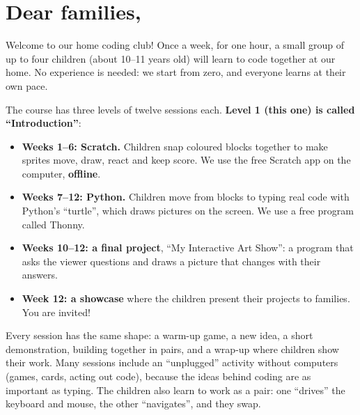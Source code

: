 \documentclass[level=1]{kidscode}
\begin{document}

\section{Dear families,}
Welcome to our home coding club! Once a week, for one hour, a small group of up to four children
(about 10--11 years old) will learn to code together at our home. No experience is needed: we start
from zero, and everyone learns at their own pace.

The course has three levels of twelve sessions each. \textbf{Level 1 (this one) is called
\enquote{Introduction}}:
\begin{itemize}[itemsep=2pt]
  \item \textbf{Weeks 1--6: Scratch.} Children snap coloured blocks together to make sprites move, draw,
        react and keep score. We use the free Scratch app on the computer, \textbf{offline}.
  \item \textbf{Weeks 7--12: Python.} Children move from blocks to typing real code with Python's
        \enquote{turtle}, which draws pictures on the screen. We use a free program called Thonny.
  \item \textbf{Weeks 10--12: a final project}, \enquote{My Interactive Art Show}: a program that asks
        the viewer questions and draws a picture that changes with their answers.
  \item \textbf{Week 12: a showcase} where the children present their projects to families. You are invited!
\end{itemize}
Every session has the same shape: a warm-up game, a new idea, a short demonstration, building
together in pairs, and a wrap-up where children show their work. Many sessions include an
\enquote{unplugged} activity without computers (games, cards, acting out code), because the ideas
behind coding are as important as typing. The children also learn to work as a pair: one
\enquote{drives} the keyboard and mouse, the other \enquote{navigates}, and they swap.
\end{document}
